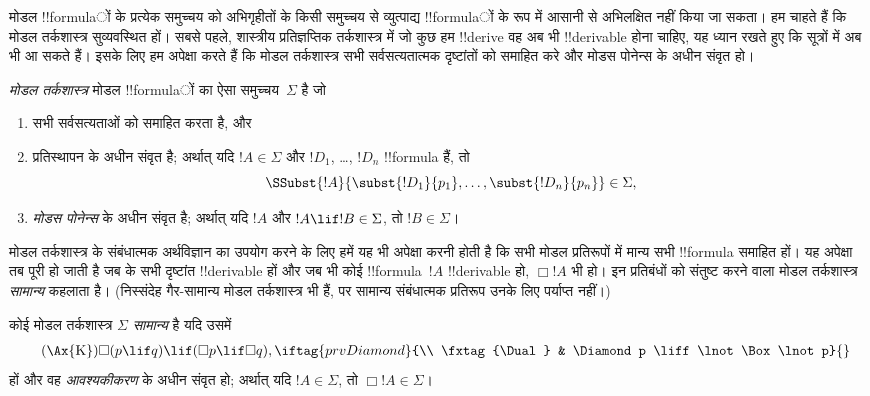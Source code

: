 \documentclass[../../../include/open-logic-section]{subfiles}
\begin{document}


मोडल !!{formula}ों के प्रत्येक समुच्चय को अभिगृहीतों के किसी समुच्चय से
व्युत्पाद्य !!{formula}ों के रूप में आसानी से अभिलक्षित नहीं किया जा सकता। हम
चाहते हैं कि मोडल तर्कशास्त्र सुव्यवस्थित हों। सबसे पहले, शास्त्रीय
प्रतिज्ञप्तिक तर्कशास्त्र में जो कुछ हम !!{derive} वह अब भी
!!{derivable} होना चाहिए, यह ध्यान रखते हुए कि सूत्रों में अब
 भी आ सकते हैं। इसके लिए हम
अपेक्षा करते हैं कि मोडल तर्कशास्त्र सभी सर्वसत्यतात्मक दृष्टांतों को समाहित
करे और मोडस पोनेन्स के अधीन संवृत हो।

\begin{defn}
  \emph{मोडल तर्कशास्त्र} मोडल !!{formula}ों का ऐसा समुच्चय~$\Sigma$ है जो
  \begin{enumerate}
  \item सभी सर्वसत्यताओं को समाहित करता है, और
  \item प्रतिस्थापन के अधीन संवृत है; अर्थात् यदि $!A \in \Sigma$ और
    $!D_1$, \dots, $!D_n$ !!{formula} हैं, तो
    \[
    \SSubst{!A}{\subst{!D_1}{p_1}, \dots, \subst{!D_n}{p_n}} \in \Sigma,
    \]
    \item \emph{मोडस पोनेन्स} के अधीन संवृत है; अर्थात् यदि $!A$ और
      $!A \lif !B \in \Sigma$, तो $!B \in \Sigma$।
  \end{enumerate}
\end{defn}

मोडल तर्कशास्त्र के संबंधात्मक अर्थविज्ञान का उपयोग करने के लिए हमें यह भी
अपेक्षा करनी होती है कि सभी मोडल प्रतिरूपों में मान्य सभी !!{formula} समाहित
हों। यह अपेक्षा तब पूरी हो जाती है जब 
के सभी दृष्टांत !!{derivable} हों और जब भी कोई !!{formula}~$!A$
!!{derivable} हो, $\Box !A$ भी हो। इन प्रतिबंधों को संतुष्ट करने वाला मोडल
तर्कशास्त्र \emph{सामान्य} कहलाता है। (निस्संदेह गैर-सामान्य मोडल
तर्कशास्त्र भी हैं, पर सामान्य संबंधात्मक प्रतिरूप उनके लिए पर्याप्त नहीं।)

\begin{defn}
  कोई मोडल तर्कशास्त्र $\Sigma$ \emph{सामान्य} है यदि उसमें
  \begin{align*}
    \tag{\Ax{K}} & \Box(p \lif q) \lif (\Box p \lif \Box q),
    \iftag{prvDiamond}{\\
      \tag{\Dual} & \Diamond p \liff \lnot\Box\lnot p}{}
  \end{align*}
  हों और वह \emph{आवश्यकीकरण} के अधीन संवृत हो; अर्थात् यदि
  $!A \in \Sigma$, तो $\Box !A \in \Sigma$।
\end{defn}
\end{document}
